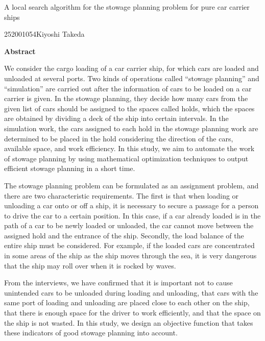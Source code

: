 \newpage
\begin{center}{\LARGE A local search algorithm for the stowage planning problem for pure car carrier ships }\\[0.5cm]
\end{center}
\hfill {\large 252001054\qquad Kiyoshi Takeda}\\[0.5cm]
\begin{center}
{\large \bf Abstract}\\
\end{center}

We consider the cargo loading of a car carrier ship, for which cars are loaded and unloaded at several ports.
Two kinds of operations called “stowage planning” and “simulation” are carried out after the information of cars to be loaded on a car carrier is given.
In the stowage planning, they decide how many cars from the given list of cars should be assigned to the spaces called holds, which the spaces are obtained by dividing a deck of the ship into certain intervals.
In the simulation work, the cars assigned to each hold in the stowage planning work are determined to be placed in the hold considering the direction of the cars, available space, and work efficiency.
In this study, we aim to automate the work of stowage planning by using mathematical optimization techniques to output efficient stowage planning in a short time.

The stowage planning problem can be formulated as an assignment problem, and there are two characteristic requirements.
The first is that when loading or unloading a car onto or off a ship, it is necessary to secure a passage for a person to drive the car to a certain position.
In this case, if a car already loaded is in the path of a car to be newly loaded or unloaded, the car cannot move between the assigned hold and the entrance of the ship.
Secondly, the load balance of the entire ship must be considered.
For example, if the loaded cars are concentrated in some areas of the ship as the ship moves through the sea, it is very dangerous that the ship may roll over when it is rocked by waves.

From the interviews, we have confirmed that it is important not to cause unintended cars to be unloaded during loading and unloading, that cars with the same port of loading and unloading are placed close to each other on the ship, that there is enough space for the driver to work efficiently, and that the space on the ship is not wasted. In this study, we design an objective function that takes these indicators of good stowage planning into account.

